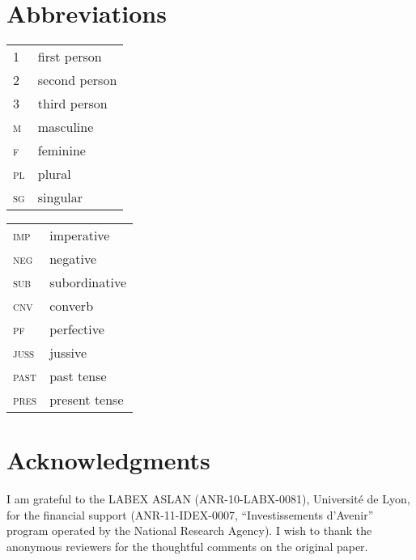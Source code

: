 \documentclass[output=paper,modfonts,nonflat,hidelinks]{langsci/langscibook}
\begin{document}
\section*{Abbreviations}
\begin{tabularx}{.45\textwidth}{>{\scshape}lQ}
1 & {first person}\\
 2 & {second person}\\
 3 & {third person}\\
 m & {masculine}\\
 f & {feminine}\\
 pl & plural\\
 sg & singular\\ 
\end{tabularx}
\begin{tabularx}{.45\textwidth}{>{\scshape}lQ}
 imp & imperative\\
 neg & negative\\
 sub & subordinative\\
 cnv & converb\\
 pf & perfective\\
 juss & jussive\\
 past & {past tense}\\
 pres & present tense\\ 
\end{tabularx}


\section*{Acknowledgments}
I am grateful to the LABEX ASLAN (ANR-10-LABX-0081), Université de
Lyon, for the financial support (ANR-11-IDEX-0007, “Investissements d’Avenir” program operated by the  National Research Agency). I wish to thank the anonymous reviewers for the thoughtful comments on the original paper. 

\sloppy
\printbibliography[heading=subbibliography,notkeyword=this]
\end{document}
